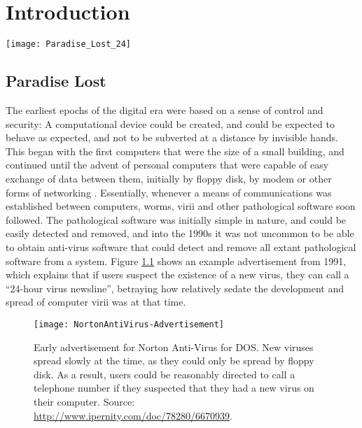 
\chapter{Introduction} %

\label{Chapter 1} %

\texttt{[image: Paradise\_Lost\_24]}

\section{Paradise Lost}

\label{Ch1 Sec1}

The earliest epochs of the digital era were based on a sense of control and security:  A computational device could be
created, and could be expected to behave as expected, and not to be subverted at a distance by invisible hands.
This began with the first computers that were the size of a small building, and continued until the advent of personal
computers that were capable of easy exchange of data between them, initially by floppy disk, by modem or
other forms of networking \cite{chen2004evolution}. 
Essentially, whenever a means of communications was established between computers, worms, virii and other
pathological software soon followed.   The pathological software was initially simple in nature, and
could be easily detected and removed, and into the 1990s it was not uncommon to be able to obtain anti-virus
software that could detect and remove all extant pathological software from a system.
Figure \ref{fig:nortonad} shows an example advertisement from 1991, which explains that if users suspect
the existence of a new virus, they can call a ``24-hour virus newsline'', betraying how relatively
sedate the development and spread of computer virii was at that time.

\begin{figure}
  \label{fig:nortonad}
  \centering
  \texttt{[image: NortonAntiVirus-Advertisement]}
  \caption{Early advertisement for Norton Anti-Virus for DOS. New viruses spread slowly at the time, as they could
    only be spread by floppy disk. As a result, users could be reasonably directed to call a telephone number if they
    suspected that they had a new virus on their computer. Source: \url{http://www.ipernity.com/doc/78280/6670939}.
    }
\end{figure}

